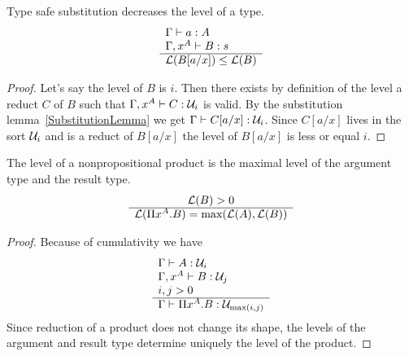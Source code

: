 \begin{theorem}
    \label{thm:LevelTypeSafeSubstitution}
    Type safe substitution decreases the level of a type.
    $$
    \begin{array}{l} 
        \Gamma \vdash a : A
        \\
        \Gamma, x^A \vdash B: s
     \\ \hline 
        {\cal L}(B[a/x]) \le {\cal L}(B)
    \end{array}
    $$
    \begin{proof}
        Let's say the level of $B$ is $i$. Then there exists by definition of
        the level a reduct $C$ of $B$ such that $\Gamma, x^A \vdash C: {\cal U}_i$
        is valid. By the substitution lemma~\ref{SubstitutionLemma} we get
        $\Gamma \vdash C[a/x]: {\cal U}_i$. Since $C[a/x]$ lives in the sort
        ${\cal U}_i$ and is a reduct of $B[a/x]$ the level of $B[a/x]$ is less or
        equal $i$.
    \end{proof}
\end{theorem}




\begin{theorem}
    \label{thm:LevelProduct}
    The level of a nonpropositional product is the maximal level of the argument
    type and the result type.
    $$
    \begin{array}{c} 
        {\cal L}(B) > 0
     \\ \hline 
        {\cal L}(\Pi x^A.B) = {\text{max}}({\cal L}(A), {\cal L}(B))
    \end{array}
    $$
    \begin{proof}
        Because of cumulativity we have
        $$
        \begin{array}{l} 
            \Gamma \vdash A: {\cal U}_i
            \\
            \Gamma,x^A \vdash B: {\cal U}_j
            \\
            i,j > 0
         \\ \hline 
            \Gamma \vdash \Pi x^A. B : {\cal U}_{{\text{max}}(i,j)}
        \end{array}
        $$
        Since reduction of a product does not change its shape, the levels of
        the argument and result type determine uniquely the level of the
        product.
    \end{proof}
\end{theorem}




